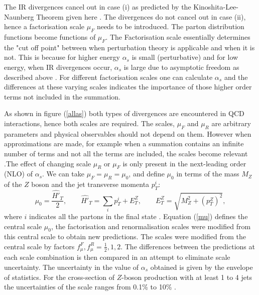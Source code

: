 \documentclass[12pt, onecolumn, nofootinbib]{revtex4}    %
\begin{document}
{The IR divergences cancel out in case (i) as predicted by the Kinoshita-Lee-Naunberg Theorem given here \cite{KNL}. The divergences do not cancel out in case (ii), hence a factorisation scale ${\mu_F}$ needs to be introduced. The parton distribution functions become functions of ${\mu_F}$. The Factorisation scale essentially determines the "cut off point" between when perturbation theory is applicable and when it is not. This is because for higher energy ${\alpha _s}$ is small (perturbative) and for low energy, when IR divergences occur, ${\alpha _s}$ is large due to asymptotic freedom as described above \cite{DMP}. For different factorisation scales one can calculate ${\alpha _s}$ and the differences at these varying scales indicates the importance of those higher order terms not included in the summation.
 
As shown in figure (\ref{allas}) both types of divergences are encountered in QCD interactions, hence both scales are required. The scales, ${\mu_F}$ and ${\mu_R}$ are arbitrary parameters and physical observables should not depend on them.  However when approximations are made, for example when a summation contains an infinite number of terms and not all the terms are included, the scales become relevant \cite{PHD}.The effect of changing scale ${\mu_R}$ or ${\mu_F}$ is only present in the next-leading order (NLO) of ${\alpha _s}$. We can take ${\mu_F = \mu_R = \mu_0}$, and define ${\mu_0}$ in terms of the mass ${M_Z}$ of the ${Z}$ boson and the jet transverse momenta ${p_T^i}$: \begin{equation} \label{mu} \mu_0 = \dfrac{\hat{H'}_T}{2}, \qquad \hat{H'}_T = \sum_i p_T^i + E_T^Z, \qquad E_T^Z = \sqrt{M_Z^2 + (p_T^Z)^2}, \end{equation} where ${i}$ indicates all the partons in the final state \cite{DMP}. Equation (\ref{mu}) defines the central scale ${\mu_0}$, the factorisation and renormalisation scales were modified from this central scale to obtain new predictions. The scales were modified from the central scale by factors ${f_\mu^F,f_\mu^R = \frac{1}{2},1,2}$. The differences between the predictions at each scale combination is then compared in an attempt to eliminate scale uncertainty. The uncertainty in the value of ${\alpha_s}$ obtained is given by the envelope of statistics. For the cross-section of ${Z}$-boson production with at least 1 to 4 jets the uncertainties of the scale ranges from 0.1\% to 10\% \cite{HEPP}. 
 
 


}
\end{document}
